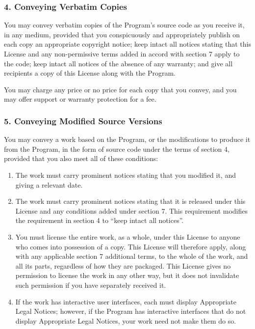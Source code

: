 \documentclass[a4paper, 11pt, twoside]{article}
\begin{document}
\subsubsection{4. Conveying Verbatim Copies}

You may convey verbatim copies of the Program's source code as you receive it, in any medium, provided that you conspicuously and appropriately publish on each copy an appropriate copyright notice; keep intact all notices stating that this License and any non-permissive terms added in accord with section 7 apply to the code; keep intact all notices of the absence of any warranty; and give all recipients a copy of this License along with the Program.

You may charge any price or no price for each copy that you convey, and you may offer support or warranty protection for a fee.

\subsubsection{5. Conveying Modified Source Versions}

You may convey a work based on the Program, or the modifications to produce it from the Program, in the form of source code under the terms of section 4, provided that you also meet all of these conditions:

\begin{enumerate}[label=\Alph*)]
\item The work must carry prominent notices stating that you modified it, and giving a relevant date.
\item The work must carry prominent notices stating that it is released under this License and any conditions added under section 7. This requirement modifies the requirement in section 4 to “keep intact all notices”.
\item You must license the entire work, as a whole, under this License to anyone who comes into possession of a copy. This License will therefore apply, along with any applicable section 7 additional terms, to the whole of the work, and all its parts, regardless of how they are packaged. This License gives no permission to license the work in any other way, but it does not invalidate such permission if you have separately received it.
\item If the work has interactive user interfaces, each must display Appropriate Legal Notices; however, if the Program has interactive interfaces that do not display Appropriate Legal Notices, your work need not make them do so.
\end{enumerate}
\end{document}
